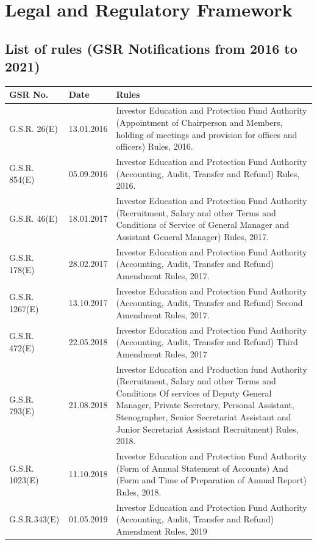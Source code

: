 \documentclass[openany]{book}
\begin{document}
\section{Legal and Regulatory Framework} \cite{iepfa_annual_reports}
\subsection{List of rules (GSR Notifications from 2016 to 2021)}
\begin{table}[H]
\centering
\begin{tabular}{|p{3cm}|p{2.5cm}|p{10cm}|}
\hline
\textbf{GSR No.} & \textbf{Date} & \textbf{Rules} \\ \hline
G.S.R. 26(E) & 13.01.2016 & Investor Education and Protection Fund Authority (Appointment of Chairperson and Members, holding of meetings and provision for offices and officers) Rules, 2016. \\ \hline
G.S.R. 854(E) & 05.09.2016 & Investor Education and Protection Fund Authority (Accounting, Audit, Transfer and Refund) Rules, 2016. \\ \hline
G.S.R. 46(E) & 18.01.2017 & Investor Education and Protection Fund Authority (Recruitment, Salary and other Terms and Conditions of Service of General Manager and Assistant General Manager) Rules, 2017. \\ \hline
G.S.R. 178(E) & 28.02.2017 & Investor Education and Protection Fund Authority (Accounting, Audit, Transfer and Refund) Amendment Rules, 2017. \\ \hline
G.S.R. 1267(E) & 13.10.2017 & Investor Education and Protection Fund Authority (Accounting, Audit, Transfer and Refund) Second Amendment Rules, 2017. \\ \hline
G.S.R. 472(E) & 22.05.2018 & Investor Education and Protection Fund Authority (Accounting, Audit, Transfer and Refund) Third Amendment Rules, 2017 \\ \hline
G.S.R. 793(E) & 21.08.2018 & Investor Education and Production fund Authority (Recruitment, Salary and other Terms and Conditions Of services of Deputy General Manager, Private Secretary, Personal Assistant, Stenographer, Senior Secretariat Assistant and Junior Secretariat Assistant Recruitment) Rules, 2018. \\ \hline
G.S.R. 1023(E) & 11.10.2018 & Investor Education and Protection Fund Authority (Form of Annual Statement of Accounts) And (Form and Time of Preparation of Annual Report) Rules, 2018. \\ \hline
G.S.R.343(E) & 01.05.2019 & Investor Education and Protection Fund Authority (Accounting, Audit, Transfer and Refund) Amendment Rules, 2019 \\ \hline

\end{tabular}
\end{table}
\end{document}
